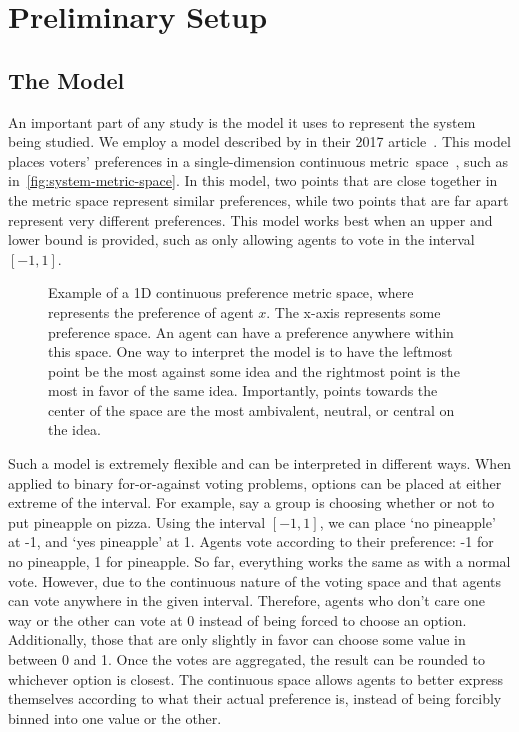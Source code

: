 \section{Preliminary Setup}\label{sec:preliminary-setup}

\subsection{The Model}\label{subsec:the-model}
An important part of any study is the model it uses to represent the system being
studied.
We employ a model described by  in their 2017
article~\cite{Cohensius2017}.
This model places voters' preferences in a single-dimension continuous
metric~space~\systemspace, such as in~\autoref{fig:system-metric-space}.
In this model, two points that are close together in the metric space represent
similar preferences, while two points that are far apart represent very different
preferences.
This model works best when an upper and lower bound is provided, such as only
allowing agents to vote in the interval $[-1, 1]$.

\begin{figure}[htbp]
    \centering
    
    \caption{
        Example of a 1D continuous preference metric space, where  represents
        the preference of agent $x$.
        The x-axis represents some preference space.
        An agent can have a preference anywhere within this space.
        One way to interpret the model is to have the leftmost point be the most
        against some idea and the rightmost point is the most in favor of the same idea.
        Importantly, points towards the center of the space are the most ambivalent,
        neutral, or central on the idea.
    }
    \label{fig:system-metric-space}
\end{figure}

Such a model is extremely flexible and can be interpreted in different ways.
When applied to binary for-or-against voting problems, options can be placed at either
extreme of the interval.
For example, say a group is choosing whether or not to put pineapple on pizza.
Using the interval $[-1, 1]$, we can place `no pineapple' at -1, and `yes pineapple'
at 1.
Agents vote according to their preference: -1 for no pineapple, 1 for pineapple.
So far, everything works the same as with a normal vote.
However, due to the continuous nature of the voting space and that agents can vote
anywhere in the given interval.
Therefore, agents who don't care one way or the other can vote at 0 instead of being
forced to choose an option.
Additionally, those that are only slightly in favor can choose some value in between
0 and 1.
Once the votes are aggregated, the result can be rounded to whichever option is
closest.
The continuous space allows agents to better express themselves according to what
their actual preference is, instead of being forcibly binned into one value or the
other.

